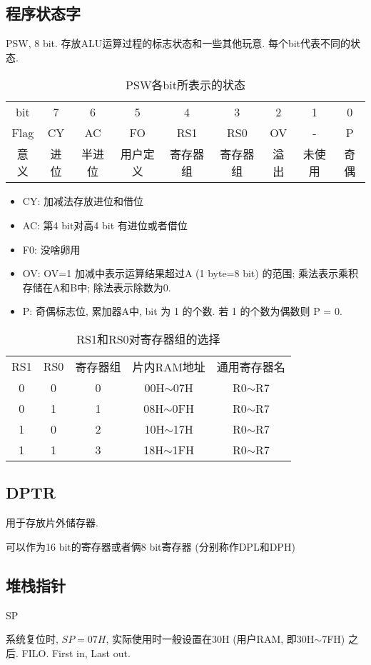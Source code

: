 \documentclass[a4paper]{report}
\begin{document}
\subsection{程序状态字}
PSW, 8 bit. 存放ALU运算过程的标志状态和一些其他玩意. 每个bit代表不同的状态. 
\begin{table}[H]
  \centering
  \begin{tabular}{c|cccccccc}
    bit & 7&6&5&4&3&2&1&0
    \\ Flag &CY&AC&FO&RS1&RS0&OV&-&P
    \\ 意义 &进位&半进位&用户定义&寄存器组&寄存器组&溢出&未使用&奇偶
  \end{tabular}
  \caption{PSW各bit所表示的状态}
  \label{tab:psw}
\end{table}
\begin{itemize}
  \item CY: 加减法存放进位和借位
  \item AC: 第4 bit对高4 bit 有进位或者借位
  \item F0: 没啥卵用
  \item OV: OV=1 加减中表示运算结果超过A (1 byte=8 bit) 的范围; 乘法表示乘积存储在A和B中; 除法表示除数为0. 
  \item P: 奇偶标志位, 累加器A中, bit 为 1 的个数. 若 1 的个数为偶数则 P = 0. 
\end{itemize}
\begin{table}[H]
  \centering
  \begin{tabular}{ccccc}
      RS1&RS0&寄存器组&片内RAM地址&通用寄存器名
    \\0&0&0&00H$\sim$07H&R0$\sim$R7
    \\0&1&1&08H$\sim$0FH&R0$\sim$R7
    \\1&0&2&10H$\sim$17H&R0$\sim$R7
    \\1&1&3&18H$\sim$1FH&R0$\sim$R7
  \end{tabular}
  \caption{RS1和RS0对寄存器组的选择}
\end{table}
\subsection{DPTR}
用于存放片外储存器. 

可以作为16 bit的寄存器或者俩8 bit寄存器 (分别称作DPL和DPH)
\subsection{堆栈指针}
SP

系统复位时, $SP=07H$, 实际使用时一般设置在30H (用户RAM, 即30H$\sim$7FH) 之后. FILO. First in, Last out. 
\end{document}

